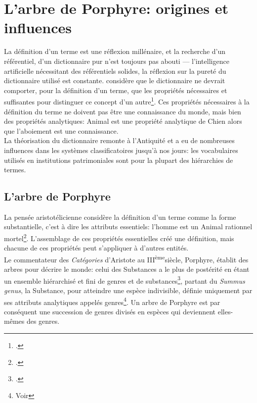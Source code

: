 \section{\label{I-C-1}L'arbre de Porphyre: origines et influences}

La définition d'un terme est une réflexion millénaire, et la recherche d'un référentiel, d'un dictionnaire pur n'est toujours pas abouti --- l'intelligence artificielle nécessitant des référentiels solides, la réflexion sur la pureté du dictionnaire utilisé est constante.  considère que le dictionnaire \og ne devrait comporter, pour la définition d'un  terme, que les propriétés nécessaires et suffisantes pour distinguer ce concept d'un autre\fg\footcite[chap.1]{eco_arbre_2010}. Ces propriétés nécessaires à la définition du terme ne doivent pas être une connaissance du monde, mais bien des propriétés analytiques: \og Animal\fg{} est une propriété analytique de \og Chien\fg{} alors que l'aboiement est une connaissance.\\

La théorisation du dictionnaire remonte à l'Antiquité et a eu de nombreuses influences dans les systèmes classificatoires jusqu'à nos jours: les vocabulaires utilisés en institutions patrimoniales sont pour la plupart des hiérarchies de termes.

\subsection{\label{I-C-1-a}L'arbre de Porphyre}

La pensée aristotélicienne considère la définition d'un terme comme la forme substantielle, c'est à dire les attributs essentiels: l'\og homme\fg{} est un \og Animal rationnel mortel\fg{}\footcite[chap.1]{eco_arbre_2010}. L'assemblage de ces propriétés essentielles créé une définition, mais chacune de ces propriétés peut s'appliquer à d'autres entités. \\

Le commentateur des \textit{Catégories} d'Aristote au \textsc{III}\textsuperscript{ème}siècle, Porphyre, établit des arbres pour décrire le monde: celui des \og Substances\fg{} a le plus de postérité en étant \og un ensemble hiérarchisé et fini de genres et de substances\fg{}\footcite[chap.1]{eco_arbre_2010}, partant du \textit{Summus genus}, la Substance, pour atteindre une espèce indivisible, définie uniquement par ses attributs analytiques appelés genres\footnote{Voir }. Un arbre de Porphyre est par conséquent une succession de genres divisés en espèces qui deviennent elles-mêmes des genres.\\

